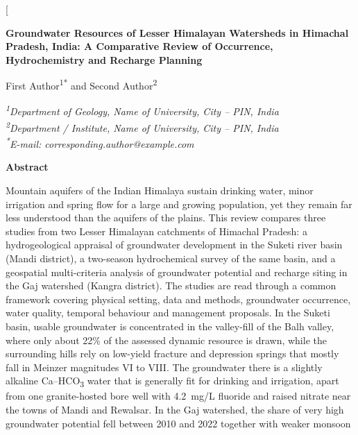 \documentclass[10pt,a4paper,twocolumn]{article}
\makeatletter
\newcommand{\AuthorOne}{First Author}
\newcommand{\AuthorTwo}{Second Author}
\newcommand{\AffilOne}{Department of Geology, Name of University, City -- PIN, India}
\newcommand{\AffilTwo}{Department / Institute, Name of University, City -- PIN, India}
\newcommand{\CorrEmail}{corresponding.author@example.com}
\makeatother
\begin{document}
\twocolumn[{%
\thispagestyle{firstpage}
\begin{center}
  {\fontsize{16}{20}\selectfont\bfseries
   Groundwater Resources of Lesser Himalayan Watersheds in Himachal Pradesh, India:
   A Comparative Review of Occurrence, Hydrochemistry and Recharge Planning\par}
  \vspace{9pt}
  {\large \AuthorOne\textsuperscript{1*} and \AuthorTwo\textsuperscript{2}\par}
  \vspace{5pt}
  {\small\itshape
   \textsuperscript{1}\AffilOne\\
   \textsuperscript{2}\AffilTwo\\
   \textsuperscript{*}E-mail: \CorrEmail\par}
\end{center}
\vspace{6pt}
\noindent\colorbox{jgsrgray}{%
\begin{minipage}{\dimexpr\textwidth-2\fboxsep\relax}
\vspace{4pt}
{\bfseries Abstract}\par\vspace{3pt}
\small
Mountain aquifers of the Indian Himalaya sustain drinking water, minor irrigation and
spring flow for a large and growing population, yet they remain far less understood than
the aquifers of the plains. This review compares three studies from two Lesser Himalayan
catchments of Himachal Pradesh: a hydrogeological appraisal of groundwater development in
the Suketi river basin (Mandi district), a two-season hydrochemical survey of the same
basin, and a geospatial multi-criteria analysis of groundwater potential and recharge
siting in the Gaj watershed (Kangra district). The studies are read through a common
framework covering physical setting, data and methods, groundwater occurrence, water
quality, temporal behaviour and management proposals. In the Suketi basin, usable
groundwater is concentrated in the valley-fill of the Balh valley, where only about 22\% of
the assessed dynamic resource is drawn, while the surrounding hills rely on low-yield
fracture and depression springs that mostly fall in Meinzer magnitudes VI to VIII. The
groundwater there is a slightly alkaline Ca--HCO\textsubscript{3} water that is generally fit for
drinking and irrigation, apart from one granite-hosted bore well with 4.2~mg/L fluoride and
raised nitrate near the towns of Mandi and Rewalsar. In the Gaj watershed, the share of very
high groundwater potential fell between 2010 and 2022 together with weaker monsoon

\end{minipage}}}
\end{document}
